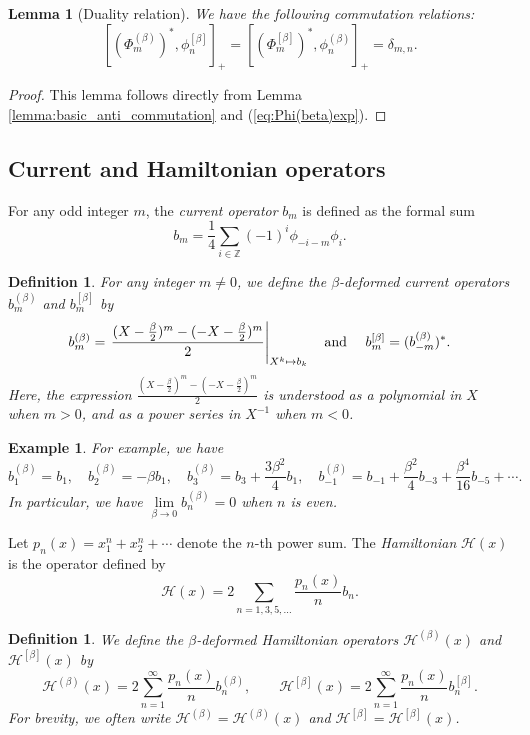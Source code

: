 \documentclass{amsart}
\newtheorem{lemma}[thm]{Lemma}
\newtheorem{defi}[thm]{Definition}
\newtheorem{example}[thm]{Example}
\def\ZZ{\mathord{\mathbb{Z}}}
\begin{document}
\begin{lemma}[Duality relation]
\label{lemma:duality}
We have the following commutation relations:
\[
[(\Phi^{(\beta)}_m)^\ast, \phi^{[\beta]}_n]_+
=[(\Phi^{[\beta]}_m)^\ast, \phi^{(\beta)}_n]_+
=\delta_{m,n}.
\]
\end{lemma}
\begin{proof}
This lemma follows directly from Lemma \ref{lemma:basic_anti_commutation} and (\ref{eq:Phi(beta)exp}).
\end{proof}

\subsection{Current and Hamiltonian operators}

For any odd integer $m$, the \textit{current operator} $b_m$ is defined as the formal sum
\[
b_m=\frac{1}{4}\sum_{i\in \ZZ}(-1)^i\phi_{-i-m}\phi_i.
\]
\begin{defi}
For any integer $m\neq 0$, we define the \textit{$\beta$-deformed current operators} $b_m^{(\beta)}$ and $b_m^{[\beta]}$ by
\[
b_m^{(\beta)}=
\left.\frac{(X-\frac{\beta}{2})^m-(-X-\frac{\beta}{2})^m }{2}\right|_{X^k\mapsto b_k}\mbox{\quad and \quad}
b_m^{[\beta]}=(b^{(\beta)}_{-m})^\ast.
\]
Here, the expression $\frac{(X-\frac{\beta}{2})^m-(-X-\frac{\beta}{2})^m }{2}$ is understood as a polynomial in $X$ when $m>0$, and as a power series in $X^{-1}$ when $m<0$.
\end{defi}
\begin{example}
For example, we have 
\[
b_1^{(\beta)}=b_1, \quad
b_2^{(\beta)}=-\beta b_1,\quad 
b_3^{(\beta)}=b_3+\frac{3\beta^2}{4}b_1,\quad b_{-1}^{(\beta)}=b_{-1}+\frac{\beta^2}{4}b_{-3}+\frac{\beta^4}{16}b_{-5}+\cdots.
\]
In particular, we have $\lim\limits_{\beta\to 0}b_n^{(\beta)}=0$ when $n$ is even.
\end{example}

Let $p_n(x)=x_1^n+x_2^n+\cdots$ denote the $n$-th power sum.
The \textit{Hamiltonian} $\mathcal{H}(x)$ is the operator defined by
\[
\mathcal{H}(x)=2\sum_{n=1,3,5,\dots} \frac{p_n(x)}{n}b_n.
\]
\begin{defi}
We define the \textit{$\beta$-deformed Hamiltonian operators} $\mathcal{H}^{(\beta)}(x)$ and  $\mathcal{H}^{[\beta]}(x)$ by 
\[
\mathcal{H}^{(\beta)}(x)=2\sum_{n=1}^\infty \frac{p_n(x)}{n}b^{(\beta)}_n,\qquad
\mathcal{H}^{[\beta]}(x)=2\sum_{n=1}^\infty \frac{p_n(x)}{n}b^{[\beta]}_n.
\]
For brevity, we often write 
$\mathcal{H}^{(\beta)}=\mathcal{H}^{(\beta)}(x)$ and
$\mathcal{H}^{[\beta]}=\mathcal{H}^{[\beta]}(x)$.
\end{defi}
\end{document}
